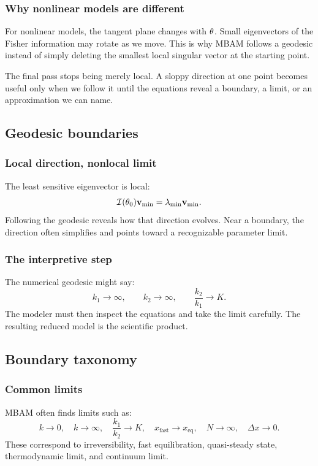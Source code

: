 \subsubsection*{Why nonlinear models are different}

For nonlinear models, the tangent plane changes with \(\theta\).  Small eigenvectors of the Fisher information may rotate as we move.  This is why MBAM follows a geodesic instead of simply deleting the smallest local singular vector at the starting point.

\noindent
The final pass stops being merely local.  A sloppy direction at one point becomes useful only when we follow it until the equations reveal a boundary, a limit, or an approximation we can name.

\subsection{Geodesic boundaries}

\subsubsection*{Local direction, nonlocal limit}

The least sensitive eigenvector is local:
\[
  \mathcal{I}(\theta_0)\mathbf{v}_{\min}
  =
  \lambda_{\min}\mathbf{v}_{\min}.
\]
Following the geodesic reveals how that direction evolves.  Near a boundary, the direction often simplifies and points toward a recognizable parameter limit.

\subsubsection*{The interpretive step}

The numerical geodesic might say:
\[
  k_1\to\infty,
  \qquad
  k_2\to\infty,
  \qquad
  \frac{k_2}{k_1}\to K.
\]
The modeler must then inspect the equations and take the limit carefully.  The resulting reduced model is the scientific product.

\subsection{Boundary taxonomy}

\subsubsection*{Common limits}

MBAM often finds limits such as:
\[
  k\to 0,\quad
  k\to\infty,\quad
  \frac{k_1}{k_2}\to K,\quad
  x_{\mathrm{fast}}\to x_{\mathrm{eq}},\quad
  N\to\infty,\quad
  \Delta x\to 0.
\]
These correspond to irreversibility, fast equilibration, quasi-steady state, thermodynamic limit, and continuum limit.

